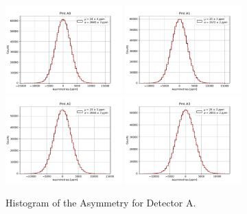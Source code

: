 \begin{figure}[hbtp]
\centering
\includegraphics[width = 0.40\textwidth]{Analysis/Histogram/A0.pdf} 
\includegraphics[width = 0.40\textwidth]{Analysis/Histogram/A1.pdf}\\
\includegraphics[width = 0.40\textwidth]{Analysis/Histogram/A2.pdf} 
\includegraphics[width = 0.40\textwidth]{Analysis/Histogram/A3.pdf}
\caption{Histogram of the Asymmetry for Detector A.}
\end{figure}

